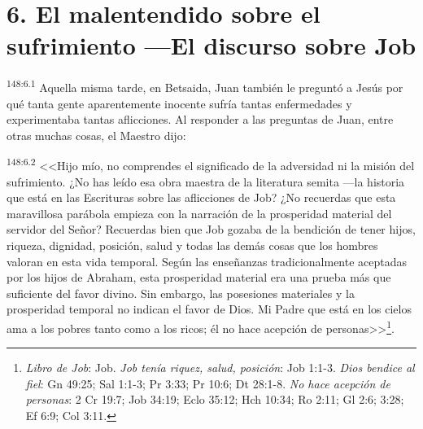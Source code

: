 \section*{6. El malentendido sobre el sufrimiento ---El discurso sobre Job}
\par 
\textsuperscript{148:6.1} Aquella misma tarde, en Betsaida, Juan también le preguntó a Jesús por qué tanta gente aparentemente inocente sufría tantas enfermedades y experimentaba tantas aflicciones. Al responder a las preguntas de Juan, entre otras muchas cosas, el Maestro dijo:

\par 
\textsuperscript{148:6.2} <<Hijo mío, no comprendes el significado de la adversidad ni la misión del sufrimiento. ¿No has leído esa obra maestra de la literatura semita ---la historia que está en las Escrituras sobre las aflicciones de Job? ¿No recuerdas que esta maravillosa parábola empieza con la narración de la prosperidad material del servidor del Señor? Recuerdas bien que Job gozaba de la bendición de tener hijos, riqueza, dignidad, posición, salud y todas las demás cosas que los hombres valoran en esta vida temporal. Según las enseñanzas tradicionalmente aceptadas por los hijos de Abraham, esta prosperidad material era una prueba más que suficiente del favor divino. Sin embargo, las posesiones materiales y la prosperidad temporal no indican el favor de Dios. Mi Padre que está en los cielos ama a los pobres tanto como a los ricos; él no hace acepción de personas>>\footnote{\textit{Libro de Job}: Job. \textit{Job tenía riquez, salud, posición}: Job 1:1-3. \textit{Dios bendice al fiel}: Gn 49:25; Sal 1:1-3; Pr 3:33; Pr 10:6; Dt 28:1-8. \textit{No hace acepción de personas}: 2 Cr 19:7; Job 34:19; Eclo 35:12; Hch 10:34; Ro 2:11; Gl 2:6; 3:28; Ef 6:9; Col 3:11.}.

